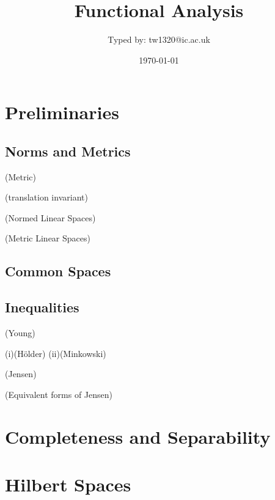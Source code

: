 \documentclass{article}
\title{Functional Analysis}
\author{Typed by: tw1320@ic.ac.uk}
\date{\today}
\begin{document}
\maketitle

\section{Preliminaries}   

\subsection{Norms and Metrics}

\begin{defn}
(Metric)
\end{defn}
(translation invariant)

\begin{defn}
(Normed Linear Spaces)
\end{defn} 

\begin{defn}
(Metric Linear Spaces)
\end{defn}
\subsection{Common Spaces}
\subsection{Inequalities}

\begin{prop}
(Young)
\end{prop}

\begin{cor}
(i)(Hölder)
(ii)(Minkowski)
\end{cor}

\begin{prop}
(Jensen)
\end{prop}

\begin{prop}
(Equivalent forms of Jensen)
\end{prop}  

\section{Completeness and Separability}  

\section{Hilbert Spaces}  
\end{document}
